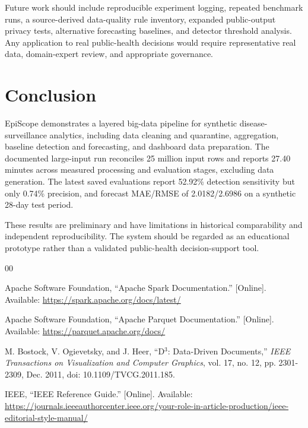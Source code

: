 \documentclass[conference]{IEEEtran}
\begin{document}
Future work should include reproducible experiment logging, repeated benchmark runs, a source-derived data-quality rule inventory, expanded public-output privacy tests, alternative forecasting baselines, and detector threshold analysis. Any application to real public-health decisions would require representative real data, domain-expert review, and appropriate governance.

\section{Conclusion}

EpiScope demonstrates a layered big-data pipeline for synthetic disease-surveillance analytics, including data cleaning and quarantine, aggregation, baseline detection and forecasting, and dashboard data preparation. The documented large-input run reconciles 25 million input rows and reports 27.40 minutes across measured processing and evaluation stages, excluding data generation. The latest saved evaluations report 52.92\% detection sensitivity but only 0.74\% precision, and forecast MAE/RMSE of 2.0182/2.6986 on a synthetic 28-day test period.

These results are preliminary and have limitations in historical comparability and independent reproducibility. The system should be regarded as an educational prototype rather than a validated public-health decision-support tool.

\begin{thebibliography}{00}

Apache Software Foundation, ``Apache Spark Documentation.''
[Online]. Available: \url{https://spark.apache.org/docs/latest/}

Apache Software Foundation, ``Apache Parquet Documentation.''
[Online]. Available: \url{https://parquet.apache.org/docs/}

M. Bostock, V. Ogievetsky, and J. Heer, ``D$^3$: Data-Driven Documents,''
\emph{IEEE Transactions on Visualization and Computer Graphics},
vol. 17, no. 12, pp. 2301-2309, Dec. 2011,
doi: 10.1109/TVCG.2011.185.

IEEE, ``IEEE Reference Guide.'' [Online]. Available:
\url{https://journals.ieeeauthorcenter.ieee.org/your-role-in-article-production/ieee-editorial-style-manual/}

\end{thebibliography}

\appendices

\end{document}

